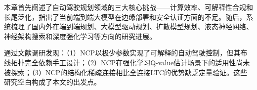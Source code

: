 \xiaosi

本章首先阐述了自动驾驶规划领域的三大核心挑战——计算效率、可解释性合规和长尾泛化，指出了当前端到端大模型在边缘部署和安全认证方面的不足。随后，系统梳理了国内外在端到端规划、大模型驱动规划、扩散模型规划、液态神经网络、神经架构搜索和深度强化学习等方向的研究进展。

通过文献调研发现：（1）NCP以极少参数实现了可解释的自动驾驶控制，但其布线拓扑完全依赖手工设计；（2）NCP在强化学习Q-value估计场景下的适用性尚未被探索；（3）NCP的结构化稀疏连接相比全连接LTC的优势缺乏定量验证。这些研究空白构成了本文的出发点。
